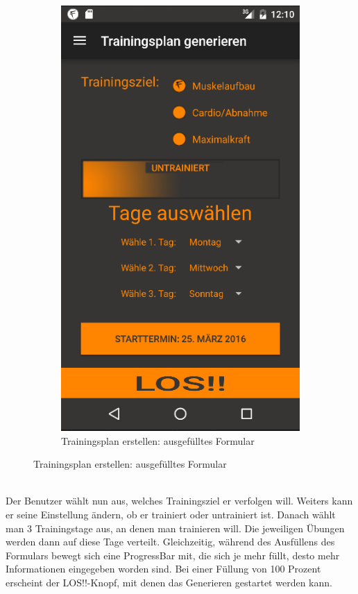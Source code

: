 \documentclass[FIPLY_base.tex]{subfiles}
\begin{document}
\begin{figure}[H]
\begin{subfigure}[b]{0.5\textwidth}
			\includegraphics[scale=0.5]{img/generieren2}
			\caption{Trainingsplan erstellen: ausgefülltes Formular}
		\end{subfigure}
	\end{figure}
	\ \\
	Der Benutzer wählt nun aus, welches Trainingsziel er verfolgen will. Weiters kann er seine Einstellung ändern, ob er trainiert oder untrainiert ist. Danach wählt man 3 Trainingstage aus, an denen man trainieren will. Die jeweiligen Übungen werden dann auf diese Tage verteilt. Gleichzeitig, während des Ausfüllens des Formulars bewegt sich eine ProgressBar mit, die sich je mehr füllt, desto mehr Informationen eingegeben worden sind. Bei einer Füllung von 100 Prozent erscheint der \grqq{}LOS!!\grqq{}-Knopf, mit denen das Generieren gestartet werden kann. 
\end{document}
